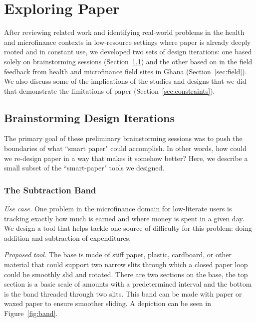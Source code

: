 \documentclass{sig-alternate}
\begin{document}
\section{Exploring Paper}
\label{sec:exploring-paper}

After reviewing related work and identifying real-world problems in the health and microfinance contexts in low-resource settings where paper is already deeply rooted and in constant use, we developed two sets of design iterations: one based solely on brainstorming sessions (Section~\ref{sec:brainstorming}) and the other based on in the field feedback from health and microfinance field sites in Ghana (Section~\ref{sec:field}). We also discuss some of the implications of the studies and designs that we did that demonstrate the limitations of paper (Section~\ref{sec:constraints}).

\subsection{Brainstorming Design Iterations}
\label{sec:brainstorming}

The primary goal of these preliminary brainstorming sessions was to push the boundaries of what ``smart paper" could accomplish. In other words, how could we re-design paper in a way that makes it somehow better? Here, we describe a small subset of the ``smart-paper" tools we designed.

\subsubsection{The Subtraction Band}
\label{sec:subtraction}

\emph{Use case.}
One problem in the microfinance domain for low-literate users is tracking exactly how much is earned and where money is spent in a given day. We design a tool that helps tackle one source of difficulty for this problem: doing addition and subtraction of expenditures.

\emph{Proposed tool.}
The base is made of stiff paper, plastic, cardboard, or other material that could support two narrow slits through which a closed paper loop could be smoothly slid and rotated. There are two sections on the base, the top section is a basic scale of amounts with a predetermined interval and the bottom is the band threaded through two slits. This band can be made with paper or waxed paper to ensure smoother sliding. A depiction can be seen in Figure~\ref{fig:band}.
\end{document}

